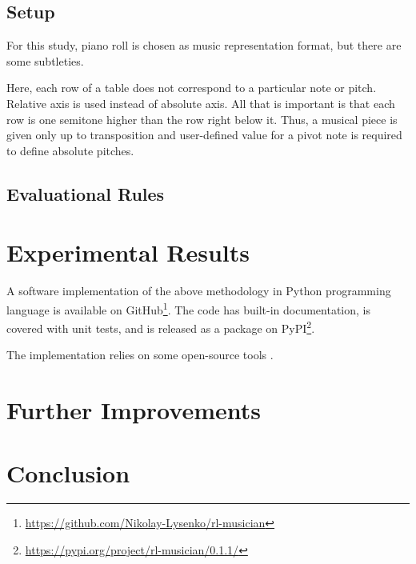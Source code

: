 \documentclass{article}
\begin{document}
\subsection{Setup}
\label{subsec:setup}

For this study, piano roll is chosen as music representation format, but there are some subtleties.

Here, each row of a table does not correspond to a particular note or pitch. Relative axis is used instead of absolute axis. All that is important is that each row is one semitone higher than the row right below it. Thus, a musical piece is given only up to transposition and user-defined value for a pivot note is required to define absolute pitches.

\subsection{Evaluational Rules}
\label{subsec:setup}


\section{Experimental Results}
\label{sec:results}

A software implementation of the above methodology in Python programming language is available on GitHub\footnote{\url{https://github.com/Nikolay-Lysenko/rl-musician}}. The code has built-in documentation, is covered with unit tests, and is released as a package on PyPI\footnote{\url{https://pypi.org/project/rl-musician/0.1.1/}}.

The implementation relies on some open-source tools \cite{brockman2016openai,chollet2015keras,oliphant2006guide,raffel2014intuitive,dong2018pypianoroll}.


\section{Further Improvements}
\label{sec:improvements}


\section{Conclusion}
\label{sec:conclusion}


  

\end{document}
